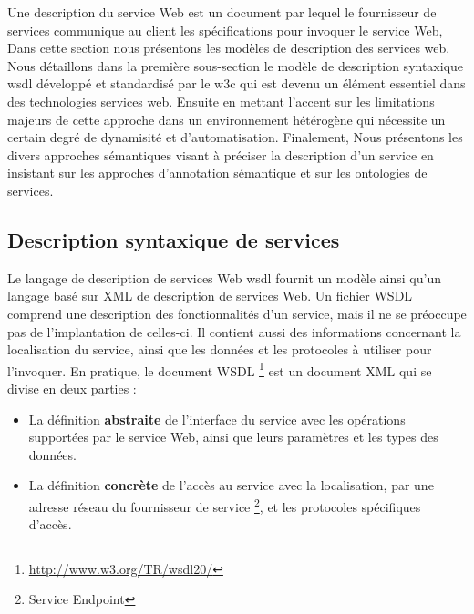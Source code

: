   \cite{lopez2008selection} Une description du service Web est un
  document par lequel le fournisseur de services communique au client
  les spécifications pour invoquer le service Web, Dans cette section
  nous présentons les modèles de description des services web. Nous
  détaillons dans la première sous-section le modèle de description
  syntaxique \acrshort{wsdl} \cite{chinnici2007web} développé et
  standardisé par le \acrshort{w3c} qui est devenu un élément
  essentiel dans des technologies services web. Ensuite en mettant
  l'accent sur les limitations majeurs de cette approche dans un
  environnement hétérogène qui nécessite un certain degré de
  dynamisité et d'automatisation.  Finalement, Nous présentons les
  divers approches sémantiques visant à préciser la description d'un
  service en insistant sur les approches d'annotation sémantique et
  sur les ontologies de services.

  \subsection{Description syntaxique de services}
  \label{sec:ws-syntaxique-description}
  Le langage de description de services Web \acrshort{wsdl}
  \cite{chinnici2007web} fournit un modèle ainsi qu'un langage basé
  sur \textsc{XML} de description de services Web. Un fichier
  \textsc{WSDL} comprend une description des fonctionnalités d'un
  service, mais il ne se préoccupe pas de l'implantation de celles-ci.
  Il contient aussi des informations concernant la localisation du
  service, ainsi que les données et les protocoles à utiliser pour
  l'invoquer. En pratique, le document \textsc{WSDL}
  \footnote{\url{http://www.w3.org/TR/wsdl20/}} est un document
  \textsc{XML} qui se divise en deux parties \cite{elie2010} :

  \SpecialItem
  \begin{itemize} %
    \item La définition \textbf{abstraite} de l'interface du service
      avec les opérations supportées par le service Web, ainsi que leurs
      paramètres et les types des données.
      
    \item La définition \textbf{concrète} de l'accès au service avec la
      localisation, par une adresse réseau du fournisseur de service
      \footnote{Service Endpoint}, et les protocoles spécifiques d'accès.
  \end{itemize}

